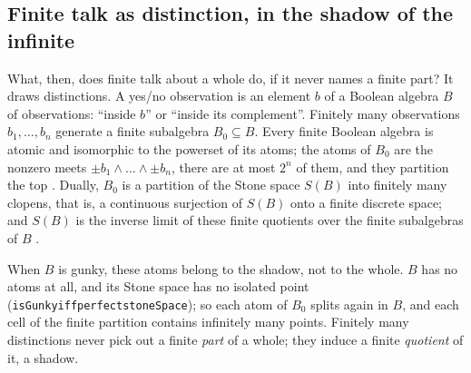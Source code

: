\documentclass[]{article}
\theoremstyle{definition}
\theoremstyle{remark}
\newcommand{\codeus}{\textunderscore\allowbreak}
\newcommand{\code}[1]{\texttt{\let\_\codeus #1}}
\begin{document}
\subsection{Finite talk as distinction, in the shadow of the infinite}
\label{sec:shadow}

What, then, does finite talk about a whole do, if it never names a finite part? It draws
distinctions. A yes/no observation is an element $b$ of a Boolean algebra $B$ of observations:
``inside $b$'' or ``inside its complement''. Finitely many observations $b_1,\dots,b_n$ generate a
finite subalgebra $B_0\subseteq B$. Every finite Boolean algebra is atomic and isomorphic to the
powerset of its atoms; the atoms of $B_0$ are the nonzero meets $\pm b_1\wedge\dots\wedge\pm b_n$, there
are at most $2^n$ of them, and they partition the top \cite{GivantHalmos2009}. Dually, $B_0$ is a
partition of the Stone space $S(B)$ into finitely many clopens, that is, a continuous surjection of
$S(B)$ onto a finite discrete space; and $S(B)$ is the inverse limit of these finite quotients over
the finite subalgebras of $B$ \cite{Johnstone1982}.

When $B$ is gunky, these atoms belong to the shadow, not to the whole. $B$ has no atoms at all, and
its Stone space has no isolated point (\code{isGunky\_iff\_perfect\_stoneSpace}); so each atom of
$B_0$ splits again in $B$, and each cell of the finite partition contains infinitely many points.
Finitely many distinctions never pick out a finite \emph{part} of a whole; they induce a finite
\emph{quotient} of it, a shadow.
\end{document}
